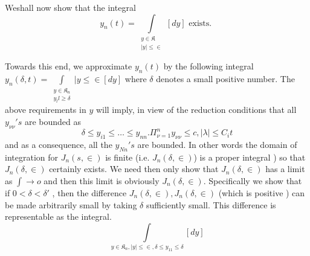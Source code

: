 We\pageoriginale  shall now show that the integral 
$$
y_n (t) = \int\limits_{\substack{ y \in \mathfrak{K}
    \\ |y|\leq \in }}[d y ] 
\text { exists. }
$$

Towards this end, we approximate $y _n (t)$ by the following
integral $y _n (\delta , t) = \int\limits_{\substack{ y \in
    \mathfrak{K}_n \\ y _ll \geq \delta }} |y \leq \in [d y]
$ where $\delta$ denotes a small positive number. The above requirements in
$y$ will imply, in view of the reduction conditions that all $ y
_{\nu\nu} ' s$ are bounded as  
$$
\delta \leq y_{i1} \leq \ldots \leq y_{nn}. \Pi^n _{\nu = 1}
y_{\nu\nu} \leq c , |\lambda| \leq C_i t 
$$
and as a consequence, all the $y _{ N n }' s $ are bounded. In other
words the domain of integration for $J_n (s , \in)$ is finite
(i.e. $J_n (\delta , \in)$) is a proper integral ) so that $J_n
(\delta , \in)$ certainly exists. We need then only show that $J_n
(\delta , \in)$ has a limit as $\int \to o$ and then this limit is
obviously $J_n (\delta, \in)$. Specifically we show that if $0 <
\delta < \delta '$ , then the difference $J_n (\delta , \in), J_n
(\delta , \in)$ (which is positive ) can be made arbitrarily small by
taking $\delta$ sufficiently small. This difference is representable
as the integral.  
\begin{equation*}
\int\limits_{ y \in \mathfrak{K}_n, |y| \leq \in , \delta \leq y_{11}
  \leq \delta} [dy]\tag{147}\label{eq147}   
\end{equation*}

